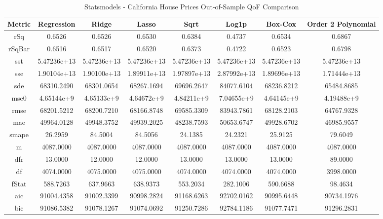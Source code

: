 \documentclass{article}
\begin{document}
\begin{table}[H]
\centering
\caption{Statsmodels - California House Prices Out-of-Sample QoF Comparison}
\label{tab:Statsmodels - House Prices Out-of-Sample QoF Comparison}
\begin{tabular}{|c|c|c|c|c|c|c|c|}\hline
Metric & Regression & Ridge & Lasso & Sqrt & Log1p & Box-Cox & Order 2 Polynomial \\ \hline \hline
rSq & 0.6526 & 0.6526 & 0.6530 & 0.6384 & 0.4737 & 0.6534 & 0.6867 \\ \hline
rSqBar & 0.6516 & 0.6517 & 0.6520 & 0.6373 & 0.4722 & 0.6523 & 0.6798 \\ \hline
sst & 5.47236e+13 & 5.47236e+13 & 5.47236e+13 & 5.47236e+13 & 5.47236e+13 & 5.47236e+13 & 5.47236e+13 \\ \hline
sse & 1.90104e+13 & 1.90100e+13 & 1.89911e+13 & 1.97897e+13 & 2.87992e+13 & 1.89696e+13 & 1.71444e+13 \\ \hline
sde & 68310.2490 & 68301.0654 & 68267.1694 & 69696.2647 & 84077.6104 & 68236.8212 & 65484.8685 \\ \hline
mse0 & 4.65144e+9 & 4.65133e+9 & 4.64672e+9 & 4.84211e+9 & 7.04655e+9 & 4.64145e+9 & 4.19488e+9 \\ \hline
rmse & 68201.5212 & 68200.7210 & 68166.8748 & 69585.3309 & 83943.7861 & 68128.2103 & 64767.9328 \\ \hline
mae & 49964.0128 & 49948.3752 & 49939.2025 & 48238.7593 & 50653.6747 & 49928.6702 & 46985.9557 \\ \hline
smape & 26.2959 & 84.5004 & 84.5056 & 24.1385 & 24.2321 & 25.9125 & 79.6049 \\ \hline
m & 4087.0000 & 4087.0000 & 4087.0000 & 4087.0000 & 4087.0000 & 4087.0000 & 4087.0000 \\ \hline
dfr & 13.0000 & 12.0000 & 12.0000 & 13.0000 & 13.0000 & 13.0000 & 89.0000 \\ \hline
df & 4074.0000 & 4075.0000 & 4075.0000 & 4074.0000 & 4074.0000 & 4074.0000 & 3998.0000 \\ \hline
fStat & 588.7263 & 637.9663 & 638.9373 & 553.2034 & 282.1006 & 590.6688 & 98.4634 \\ \hline
aic & 91004.4358 & 91002.3399 & 90998.2824 & 91168.6263 & 92702.0162 & 90995.6448 & 90734.1976 \\ \hline
bic & 91086.5382 & 91078.1267 & 91074.0692 & 91250.7286 & 92784.1186 & 91077.7471 & 91296.2831 \\ \hline
\end{tabular}
\end{table}
\end{document}
